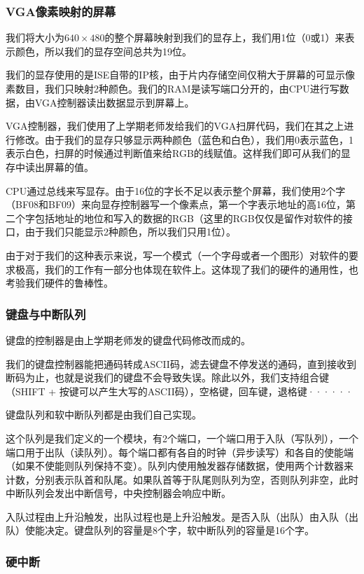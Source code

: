 \subsubsection{VGA像素映射的屏幕}

我们将大小为$640 \times 480$的整个屏幕映射到我们的显存上，我们用1位（0或1）来表示颜色，所以我们的显存空间总共为19位。

我们的显存使用的是ISE自带的IP核，由于片内存储空间仅稍大于屏幕的可显示像素数目，我们只映射2种颜色。我们的RAM是读写端口分开的，由CPU进行写数据，由VGA控制器读出数据显示到屏幕上。

VGA控制器，我们使用了上学期老师发给我们的VGA扫屏代码，我们在其之上进行修改。由于我们的显存只够显示两种颜色（蓝色和白色），我们用0表示蓝色，1表示白色，扫屏的时候通过判断值来给RGB的线赋值。这样我们即可从我们的显存中读出屏幕的值。

CPU通过总线来写显存。由于16位的字长不足以表示整个屏幕，我们使用2个字（BF08和BF09）来向显存控制器写一个像素点，第一个字表示地址的高16位，第二个字包括地址的地位和写入的数据的RGB（这里的RGB仅仅是留作对软件的接口，由于我们只能显示2种颜色，所以我们只用1位）。

由于对于我们的这种表示来说，写一个模式（一个字母或者一个图形）对软件的要求极高，我们的工作有一部分也体现在软件上。这体现了我们的硬件的通用性，也考验我们硬件的鲁棒性。

\subsubsection{键盘与中断队列}

键盘的控制器是由上学期老师发的键盘代码修改而成的。

我们的键盘控制器能把通码转成ASCII码，滤去键盘不停发送的通码，直到接收到断码为止，也就是说我们的键盘不会导致失误。除此以外，我们支持组合键（SHIFT + 按键可以产生大写的ASCII码），空格键，回车键，退格键······

键盘队列和软中断队列都是由我们自己实现。

这个队列是我们定义的一个模块，有2个端口，一个端口用于入队（写队列），一个端口用于出队（读队列）。每个端口都有各自的时钟（异步读写）和各自的使能端（如果不使能则队列保持不变）。队列内使用触发器存储数据，使用两个计数器来计数，分别表示队首和队尾。如果队首等于队尾则队列为空，否则队列非空，此时中断队列会发出中断信号，中央控制器会响应中断。

入队过程由上升沿触发，出队过程也是上升沿触发。是否入队（出队）由入队（出队）使能决定。键盘队列的容量是8个字，软中断队列的容量是16个字。

\subsubsection{硬中断}

